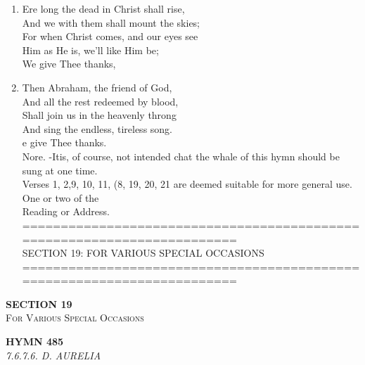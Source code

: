 \documentclass[11pt,a4paper]{article}
\begin{document}
\begin{enumerate}
    \item Ere long the dead in Christ shall rise, \\
        And we with them shall mount the skies; \\
        For when Christ comes, and our eyes see \\
        Him as He is, we'll like Him be; \\
        We give Thee thanks,

    \item Then Abraham, the friend of God, \\
        And all the rest redeemed by blood, \\
        Shall join us in the heavenly throng \\
        And sing the endless, tireless song. \\
        e give Thee thanks. \\
        Nore. -Itis, of course, not intended chat the whale of this hymn should be sung at one time. \\
        Verses 1, 2,9, 10, 11, (8, 19, 20, 21 are deemed suitable for more general use. One or two of the \\
        Reading or Address. \\
        ======================================================================== \\
        SECTION 19: FOR VARIOUS SPECIAL OCCASIONS \\
        ========================================================================

\end{enumerate}

\newpage
\thispagestyle{empty}
\vspace*{3.5cm}
\begin{center}
    {\LARGE \textbf{SECTION 19}}\\[0.8em]
    {\Large \textsc{For Various Special Occasions}}
\end{center}
\vspace{3.5cm}

\newpage
\begin{center}
    {\Large \textbf{HYMN 485}}
    \\
    \textit{7.6.7.6. D. AURELIA}
\end{center}
\vspace{1em}
\end{document}
